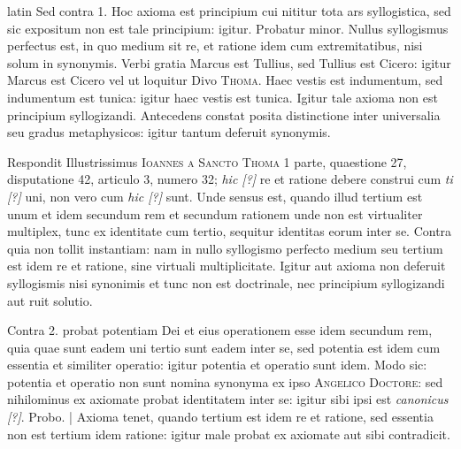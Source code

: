 \begin{otherlanguage*}{latin}
\pstart
 Sed contra 1. Hoc axioma est principium cui nititur tota ars syllogistica, sed sic expositum non est tale principium: igitur. Probatur minor. Nullus syllogismus perfectus est, in quo medium sit re, et ratione idem cum extremitatibus, nisi solum in synonymis. Verbi gratia Marcus est Tullius, sed Tullius est Cicero: igitur Marcus est Cicero vel ut loquitur Divo \textsc{Thoma}. Haec vestis est indumentum, sed indumentum est tunica: igitur haec vestis est tunica. Igitur tale axioma non est principium syllogizandi. Antecedens constat posita distinctione inter universalia seu gradus metaphysicos: igitur tantum deferuit synonymis. 
\pend

\pstart
 Respondit Illustrissimus \textsc{Ioannes a Sancto Thoma} 1 parte, quaestione 27, disputatione 42, articulo 3, numero 32; \emph{hic [?]} re et ratione debere construi cum \emph{ti [?]} uni, non vero cum \emph{hic [?]} sunt. Unde sensus est, quando illud tertium est unum et idem secundum rem et secundum rationem unde non est virtualiter multiplex, tunc ex identitate cum tertio, sequitur identitas eorum inter se. Contra quia non tollit instantiam: nam in nullo syllogismo perfecto medium seu tertium est idem re et ratione, sine virtuali multiplicitate. Igitur aut axioma non deferuit syllogismis nisi synonimis et tunc non est doctrinale, nec principium syllogizandi aut ruit solutio. 
\pend

\pstart
 Contra 2.  probat potentiam Dei et eius operationem esse idem secundum rem, quia quae sunt eadem uni tertio sunt eadem inter se, sed potentia est idem cum essentia et similiter operatio: igitur potentia et operatio sunt idem. Modo sic: potentia et operatio non sunt nomina synonyma ex ipso \textsc{Angelico Doctore}: sed nihilominus ex axiomate probat identitatem inter se: igitur sibi ipsi est \emph{canonicus [?]}. Probo. \textnormal{|} Axioma tenet, quando tertium est idem re et ratione, sed essentia non est tertium idem ratione: igitur male probat ex axiomate aut sibi contradicit. 
\pend


\end{otherlanguage*}
